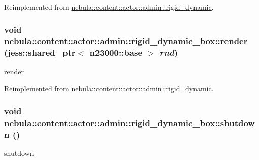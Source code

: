 Reimplemented from \hyperlink{classnebula_1_1content_1_1actor_1_1admin_1_1rigid__dynamic_accf38f3f07acdbe924c46388230d2e99}{nebula::content::actor::admin::rigid\_\-dynamic}.\hypertarget{classnebula_1_1content_1_1actor_1_1admin_1_1rigid__dynamic__box_a7e5e4c2e52b7b02c7d667cb74926e8a2}{
\subsubsection[{render}]{\setlength{\rightskip}{0pt plus 5cm}void nebula::content::actor::admin::rigid\_\-dynamic\_\-box::render (jess::shared\_\-ptr$<$ {\bf n23000::base} $>$ {\em rnd})}}
\label{classnebula_1_1content_1_1actor_1_1admin_1_1rigid__dynamic__box_a7e5e4c2e52b7b02c7d667cb74926e8a2}


render 

Reimplemented from \hyperlink{classnebula_1_1content_1_1actor_1_1admin_1_1rigid__dynamic_a891dd9d18ef100af72427ebaea9e473a}{nebula::content::actor::admin::rigid\_\-dynamic}.\hypertarget{classnebula_1_1content_1_1actor_1_1admin_1_1rigid__dynamic__box_af3ecd05192435e30fbe258f243d18adc}{
\subsubsection[{shutdown}]{\setlength{\rightskip}{0pt plus 5cm}void nebula::content::actor::admin::rigid\_\-dynamic\_\-box::shutdown ()}}
\label{classnebula_1_1content_1_1actor_1_1admin_1_1rigid__dynamic__box_af3ecd05192435e30fbe258f243d18adc}


shutdown 

